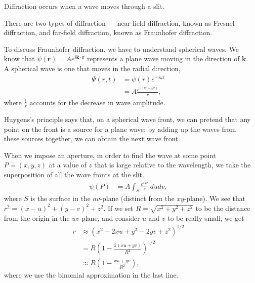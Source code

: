 \documentclass[10pt]{mypackage}
\begin{document}
\begin{example}
Diffraction occurs when a wave moves through a slit.\newline

There are two types of diffraction --- near-field diffraction, known as Fresnel diffraction, and far-field diffraction, known as Fraunhofer diffraction.\newline

To discuss Fraunhofer diffraction, we have to understand spherical waves. We know that $\psi\left(\mathbf{r}\right) = Ae^{i\mathbf{k}\cdot \mathbf{r}}$ represents a plane wave moving in the direction of $\mathbf{k}$. A spherical wave is one that moves in the radial direction,
\begin{align*}
  \Psi\left(r,t\right) &= \psi\left(r\right)e^{-i\omega t}\\
                       &= A\frac{e^{i\left(kr-\omega t\right)}}{r},
\end{align*}
where $\frac{1}{r}$ accounts for the decrease in wave amplitude.\newline

Huygens's principle says that, on a spherical wave front, we can pretend that any point on the front is a source for a plane wave; by adding up the waves from these sources together, we can obtain the next wave front.\newline

When we impose an aperture, in order to find the wave at some point $P = (x,y,z)$ at a value of $z$ that is large relative to the wavelength, we take the superposition of all the wave fronts at the slit.
\begin{align*}
  \psi\left(P\right) &= A\int_{S}^{} \frac{e^{ikr}}{r}\:du dv,
\end{align*}
where $S$ is the surface in the $uv$-plane (distinct from the $xy$-plane). We see that $r^2 = \left(x-u\right)^2 + \left(y-v\right)^2 + z^2$. If we set $R = \sqrt{x^2 + y^2 + z^2}$ to be the distance from the origin in the $uv$-plane, and consider $u$ and $v$ to be really small, we get
\begin{align*}
  r &\approx \left(x^2-2xu + y^2-2yv + z^2\right)^{1/2}\\
    &= R\left(1 - \frac{2\left(xu+yv\right)}{R^2}\right)^{1/2}\\
    &\approx R\left(1-\frac{xu + yv}{R^2}\right),
\end{align*}
where we use the binomial approximation in the last line.\newline


\end{example}
\end{document}
